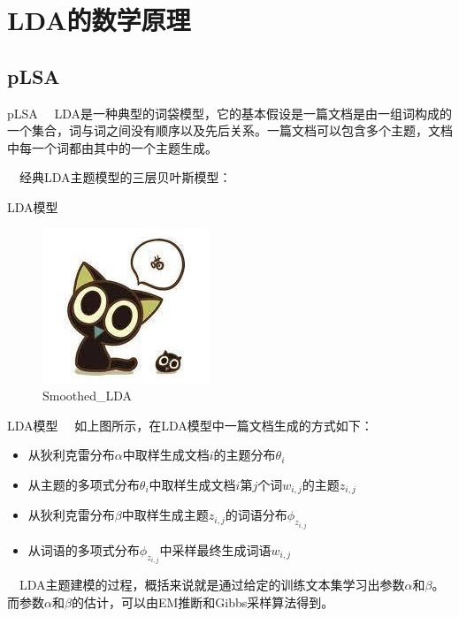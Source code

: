\documentclass[
  ignorenonframetext,
]{beamer}
\begin{document}
\hypertarget{ldaux7684ux6570ux5b66ux539fux7406}{%
\section{LDA的数学原理}\label{ldaux7684ux6570ux5b66ux539fux7406}}

\hypertarget{plsa}{%
\subsection{pLSA}\label{plsa}}

\begin{frame}{pLSA}
\(\quad\)LDA是一种典型的词袋模型，它的基本假设是一篇文档是由一组词构成的一个集合，词与词之间没有顺序以及先后关系。一篇文档可以包含多个主题，文档中每一个词都由其中的一个主题生成。

\(\quad\)经典LDA主题模型的三层贝叶斯模型：
\end{frame}

\begin{frame}{LDA模型}
\protect\hypertarget{ldaux6a21ux578b}{}
\begin{figure}
\centering
\includegraphics{./pic/Smoothed_LDA.jpg}
\caption{Smoothed\_LDA}
\end{figure}
\end{frame}

\begin{frame}{LDA模型}
\protect\hypertarget{ldaux6a21ux578b-1}{}
\(\quad\)如上图所示，在LDA模型中一篇文档生成的方式如下：

\begin{itemize}
\item
  从狄利克雷分布\(\alpha\)中取样生成文档\(i\)的主题分布\(\theta_i\)
\item
  从主题的多项式分布\(\theta_i\)中取样生成文档\(i\)第\(j\)个词\(w_{i,j}\)的主题\(z_{i,j}\)
\item
  从狄利克雷分布\(\beta\)中取样生成主题\(z_{i,j}\)的词语分布\(\phi_{z_{i,j}}\)
\item
  从词语的多项式分布\(\phi_{z_{i,j}}\)中采样最终生成词语\(w_{i,j}\)
\end{itemize}

\(\quad\)LDA主题建模的过程，概括来说就是通过给定的训练文本集学习出参数\(\alpha\)和\(\beta\)。而参数\(\alpha\)和\(\beta\)的估计，可以由EM推断和Gibbs采样算法得到。
\end{frame}
\end{document}

